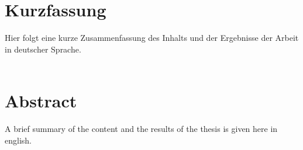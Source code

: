 \section*{Kurzfassung}
Hier folgt eine kurze Zusammenfassung des Inhalts und der Ergebnisse der Arbeit in deutscher Sprache.\\
\ \\


\section*{Abstract}
A brief summary of the content and the results of the thesis is given here in english.\\